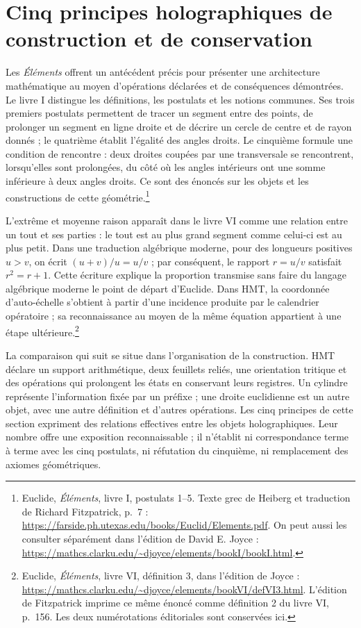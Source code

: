 \section*{Cinq principes holographiques de construction et de conservation}

Les \emph{Éléments} offrent un antécédent précis pour présenter une
architecture mathématique au moyen d’opérations déclarées et de conséquences
démontrées. Le livre I distingue les définitions, les postulats et les notions communes.
Ses trois premiers postulats permettent de tracer un segment entre des points,
de prolonger un segment en ligne droite et de décrire un cercle de centre et de rayon
donnés ; le quatrième établit l’égalité des angles droits. Le cinquième
formule une condition de rencontre : deux droites coupées par une transversale
se rencontrent, lorsqu’elles sont prolongées, du côté où les angles intérieurs ont une somme
inférieure à deux angles droits. Ce sont des énoncés sur les objets et les constructions de
cette géométrie.\footnote{Euclide, \emph{Éléments}, livre I, postulats 1--5.
Texte grec de Heiberg et traduction de Richard Fitzpatrick, p.~7 :
\url{https://farside.ph.utexas.edu/books/Euclid/Elements.pdf}. On peut aussi
les consulter séparément dans l’édition de David E. Joyce :
\url{https://mathcs.clarku.edu/~djoyce/elements/bookI/bookI.html}.}

L'extrême et moyenne raison apparaît dans le livre VI comme une relation entre un tout et ses parties : le tout est au plus grand segment comme celui-ci est au plus petit. Dans une traduction algébrique moderne, pour des longueurs positives \(u>v\), on écrit \((u+v)/u=u/v\) ; par conséquent, le rapport \(r=u/v\) satisfait \(r^2=r+1\). Cette écriture explique la proportion transmise sans faire du langage algébrique moderne le point de départ d'Euclide. Dans HMT, la coordonnée d'auto-échelle s'obtient à partir d'une incidence produite par le calendrier opératoire ; sa reconnaissance au moyen de la même équation appartient à une étape ultérieure.\footnote{Euclide, \emph{Éléments}, livre VI,
définition 3, dans l’édition de Joyce :
\url{https://mathcs.clarku.edu/~djoyce/elements/bookVI/defVI3.html}.
L’édition de Fitzpatrick imprime ce même énoncé comme définition 2
du livre VI, p.~156. Les deux numérotations éditoriales sont conservées ici.}

La comparaison qui suit se situe dans l’organisation de la construction.
HMT déclare un support arithmétique, deux feuillets reliés, une orientation
tritique et des opérations qui prolongent les états en conservant leurs registres. Un
cylindre représente l’information fixée par un préfixe ; une droite
euclidienne est un autre objet, avec une autre définition et d’autres opérations. Les
cinq principes de cette section expriment des relations effectives entre les
objets holographiques. Leur nombre offre une exposition reconnaissable ; il
n’établit ni correspondance terme à terme avec les cinq postulats,
ni réfutation du cinquième, ni remplacement des axiomes géométriques.

